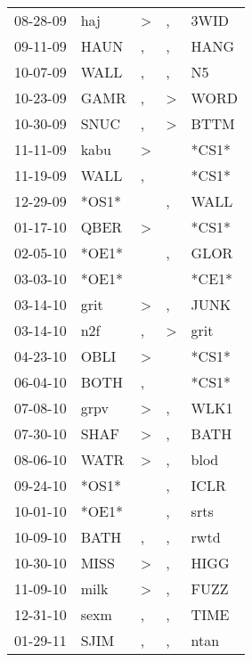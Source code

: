 \begin{supertabular}{lllll}
 08-28-09 &    haj &     \textgreater &             , &   3WID \\
 09-11-09 &   HAUN &                , &             , &   HANG \\
 10-07-09 &   WALL &                , &             , &     N5 \\
 10-23-09 &   GAMR &                , &  \textgreater &   WORD \\
 10-30-09 &   SNUC &                , &  \textgreater &   BTTM \\
 11-11-09 &   kabu &     \textgreater &               &  *CS1* \\
 11-19-09 &   WALL &                , &               &  *CS1* \\
 12-29-09 &  *OS1* &                  &             , &   WALL \\
 01-17-10 &   QBER &     \textgreater &               &  *CS1* \\
 02-05-10 &  *OE1* &                  &             , &   GLOR \\
 03-03-10 &  *OE1* &                  &               &  *CE1* \\
 03-14-10 &   grit &     \textgreater &             , &   JUNK \\
 03-14-10 &    n2f &                , &  \textgreater &   grit \\
 04-23-10 &   OBLI &     \textgreater &               &  *CS1* \\
 06-04-10 &   BOTH &                , &               &  *CS1* \\
 07-08-10 &   grpv &     \textgreater &             , &   WLK1 \\
 07-30-10 &   SHAF &     \textgreater &             , &   BATH \\
 08-06-10 &   WATR &     \textgreater &             , &   blod \\
 09-24-10 &  *OS1* &                  &             , &   ICLR \\
 10-01-10 &  *OE1* &                  &             , &   srts \\
 10-09-10 &   BATH &                , &             , &   rwtd \\
 10-30-10 &   MISS &     \textgreater &             , &   HIGG \\
 11-09-10 &   milk &     \textgreater &             , &   FUZZ \\
 12-31-10 &   sexm &                , &             , &   TIME \\
 01-29-11 &   SJIM &                , &             , &   ntan \\

\end{supertabular}
